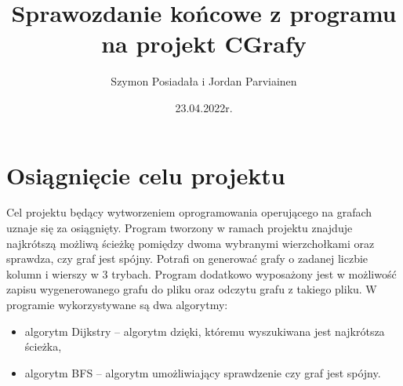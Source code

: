 \documentclass{article}
\title{Sprawozdanie końcowe z programu na projekt CGrafy}
\author{Szymon Posiadała i Jordan Parviainen}
\date{23.04.2022r.}
\begin{document}
\maketitle

\thispagestyle{firststyle}
\section{Osiągnięcie celu projektu}
Cel projektu będący wytworzeniem oprogramowania operującego na grafach uznaje się za osiągnięty.
Program tworzony w ramach projektu znajduje najkrótszą możliwą ścieżkę pomiędzy dwoma wybranymi wierzchołkami oraz sprawdza, czy graf jest spójny. 
Potrafi on generować grafy o zadanej liczbie kolumn i wierszy w 3 trybach.
Program dodatkowo wyposażony jest w możliwość zapisu wygenerowanego grafu
do pliku oraz odczytu grafu z takiego pliku. W programie wykorzystywane są dwa algorytmy:
\begin{itemize}
\item algorytm Dijkstry – algorytm dzięki, któremu wyszukiwana jest najkrótsza ścieżka,
\item algorytm BFS – algorytm umożliwiający sprawdzenie czy graf jest spójny.
\end{itemize}
\end{document}
